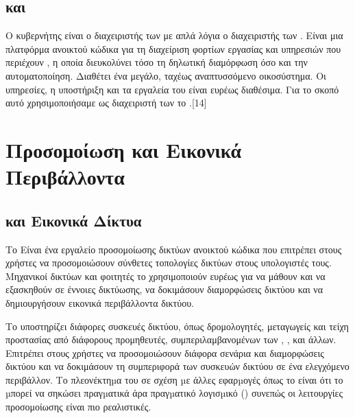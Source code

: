 \subsection{ και }
Ο κυβερνήτης είναι ο διαχειριστής των με απλά λόγια ο διαχειριστής των . Είναι μια 
πλατφόρμα ανοικτού κώδικα για τη διαχείριση φορτίων εργασίας και υπηρεσιών που περιέχουν 
, η οποία διευκολύνει τόσο τη δηλωτική διαμόρφωση όσο και την αυτοματοποίηση. 
Διαθέτει ένα μεγάλο, ταχέως αναπτυσσόμενο οικοσύστημα. Οι υπηρεσίες, η υποστήριξη και τα εργαλεία του  είναι ευρέως διαθέσιμα. Για το σκοπό αυτό χρησιμοποιήσαμε ως διαχειριστή των  το .[14]






\section{Προσομοίωση και Εικονικά Περιβάλλοντα}

\subsection{ και Εικονικά Δίκτυα}

Το  Είναι ένα εργαλείο προσομοίωσης δικτύων ανοικτού κώδικα που επιτρέπει στους χρήστες να προσομοιώσουν 
σύνθετες τοπολογίες δικτύων στους υπολογιστές τους. Μηχανικοί δικτύων και φοιτητές 
το χρησιμοποιούν ευρέως για να μάθουν και να εξασκηθούν σε έννοιες δικτύωσης, να δοκιμάσουν διαμορφώσεις δικτύου και να δημιουργήσουν εικονικά περιβάλλοντα δικτύου.


Το  υποστηρίζει διάφορες συσκευές δικτύου, όπως δρομολογητές, μεταγωγείς και τείχη προστασίας 
από διάφορους προμηθευτές, συμπεριλαμβανομένων των , ,  και άλλων. Επιτρέπει στους χρήστες να 
προσομοιώσουν διάφορα σενάρια και διαμορφώσεις δικτύου και να δοκιμάσουν τη συμπεριφορά των 
συσκευών δικτύου σε ένα ελεγχόμενο περιβάλλον. Το πλεονέκτηµα του  σε σχέση µε άλλες εφαρµογές όπως το  είναι ότι το  µπορεί να σηκώσει πραγµατικά  άρα πραγµατικό λογισµικό () συνεπώς οι λειτουργίες προσομοίωσης είναι πιο ρεαλιστικές.

